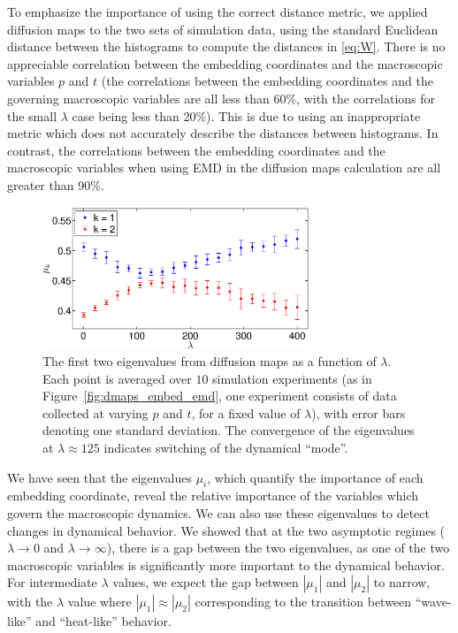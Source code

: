 \documentclass[preprint]{elsarticle}
\begin{document}

To emphasize the importance of using the correct distance metric, we applied diffusion maps to the two sets of simulation data, using the standard Euclidean distance between the histograms to compute the distances in \eqref{eq:W}.
%
There is no appreciable correlation between the embedding coordinates and the macroscopic variables $p$ and $t$ (the correlations between the embedding coordinates and the governing macroscopic variables are all  less than 60\%, with the correlations for the small $\lambda$ case being less than 20\%). 
%
This is due to using an inappropriate metric which does not accurately describe the distances between histograms.
%
In contrast, the correlations between the embedding coordinates and the macroscopic variables when using EMD in the diffusion maps calculation are all greater than 90\%.



\begin{figure}[t] 
\includegraphics[width=8cm]{detect_change_eigenvalues}
\caption{The first two eigenvalues from diffusion maps as a function of $\lambda$. Each point is averaged over $10$ simulation experiments (as in Figure~\ref{fig:dmaps_embed_emd}, one experiment consists of data collected at varying $p$ and $t$, for a fixed value of $\lambda$), with error bars denoting one standard deviation. 
The convergence of the eigenvalues at $\lambda \approx 125$ indicates switching of the dynamical ``mode''.}
\label{fig:detect_change}
\end{figure}

We have seen that the eigenvalues $\mu_i$, which quantify the importance of each embedding coordinate, reveal the relative importance of the variables which govern the macroscopic dynamics.
%
We can also use these eigenvalues to detect changes in dynamical behavior.
%
We showed that at the two asymptotic regimes ($\lambda \rightarrow 0$ and $\lambda \rightarrow \infty$), there is a gap between the two eigenvalues, as one of the two macroscopic variables is significantly more important to the dynamical behavior.
%
For intermediate $\lambda$ values, we expect the gap between $|\mu_1|$ and $|\mu_2|$ to narrow, with the $\lambda$ value where $|\mu_1| \approx |\mu_2|$ corresponding to the transition between ``wave-like'' and ``heat-like'' behavior. 
\end{document}
